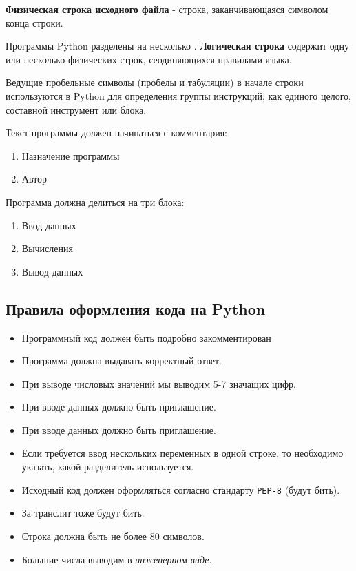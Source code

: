 \textbf{Физическая строка исходного файла} - строка, заканчивающаяся символом конца строки.

Программы Python разделены на несколько . \textbf{Логическая строка} содержит одну или несколько физических строк, сеодиняющихся правилами языка.

  Ведущие пробельные символы (пробелы и табуляции) в начале строки используются в Python для определения группы инструкций, как единого целого, составной инструмент или блока.

Текст программы должен начинаться с комментария:
\begin{enumerate}
  \item Назначение программы
  \item Автор
\end{enumerate}

Программа должна делиться на три блока:
\begin{enumerate}
  \item Ввод данных
  \item Вычисления
  \item Вывод данных
\end{enumerate}

\subsection{Правила оформления кода на Python}

\begin{itemize}
  \item Программный код должен быть подробно закомментирован
  \item Программа должна выдавать корректный ответ.
  \item При выводе числовых значений мы выводим 5-7 значащих цифр.
  \item При вводе данных должно быть приглашение.
  \item При вводе данных должно быть приглашение.
  \item Если требуется ввод нескольких переменных в одной строке, то необходимо указать, какой разделитель используется.
  \item Исходный код должен оформляться согласно стандарту \texttt{PEP-8} (будут бить).
  \item За транслит тоже будут бить.
  \item Строка должна быть не более 80 символов.
  \item Большие числа выводим в \textit{инженерном виде}. 
\end{itemize}

